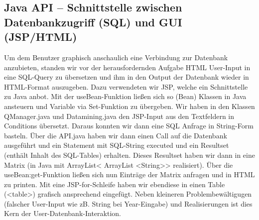 \documentclass[10pt,a4paper]{article}
\begin{document}
	\subsection{Java API – Schnittstelle zwischen Datenbankzugriff (SQL) und GUI (JSP/HTML)}
Um dem Benutzer graphisch anschaulich eine Verbindung zur Datenbank anzubieten, standen wir vor der herausfordernden Aufgabe HTML User-Input in eine SQL-Query zu übersetzen und ihm in den Output der Datenbank wieder in HTML-Format auszugeben.
Dazu verwendeten wir JSP, welche ein Schnittstelle zu Java anbot. Mit der useBean-Funktion ließen sich so (Bean) Klassen in Java ansteuern und Variable via Set-Funktion zu übergeben.
Wir haben in den Klassen QManager.java und Datamining.java den JSP-Input aus den Textfeldern in Conditions übersetzt. Daraus konnten wir dann eine SQL Anfrage in String-Form basteln.
Über die API.java haben wir dann einen Call auf die Datenbank ausgeführt und ein Statement mit SQL-String executed und ein Resultset (enthält Inhalt des SQL-Tables) erhalten. Dieses Resultset haben wir dann in eine Matrix (in Java mit ArrayList< ArrayList <String>> realisiert).
Über die useBean:get-Funktion ließen sich nun Einträge der Matrix anfragen und in HTML zu printen. Mit eine JSP-for-Schleife haben wir ebendiese in einen Table (<table>) grafisch ansprechend eingefügt.
Neben kleineren Problembewältigugen (falscher User-Input wie zB. String bei Year-Eingabe) und Realisierungen ist dies Kern der User-Datenbank-Interaktion.
\end{document}
